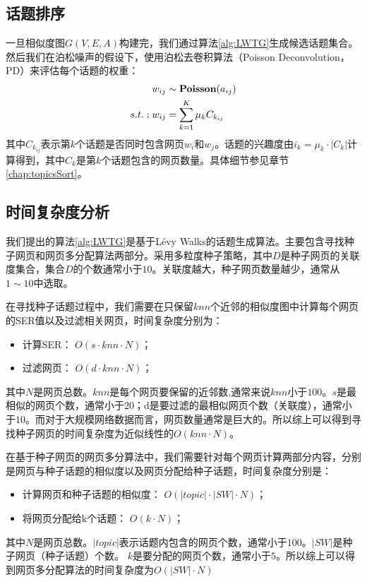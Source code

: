 \subsection{话题排序}

一旦相似度图$G(V,E,A)$构建完，我们通过算法\ref{alg:LWTG}生成候选话题集合。然后我们在泊松噪声的假设下，使用泊松去卷积算法（Poisson Deconvolution，PD）来评估每个话题的权重：
\begin{align} \label{eq:poisondeconvolution}
w_{ij} &\sim \textbf{Poisson}(a_{ij})\notag\\
s.t.: w_{ij} &= \sum_{k=1}^{K}\mu_kC_{k_{ij}}
\end{align}
其中$C_{k_{ij}}$表示第$k$个话题是否同时包含网页$w_i$和$w_j$。话题的兴趣度由$i_k=\mu_k\cdot|C_k|$计算得到，其中$C_k$是第$k$个话题包含的网页数量。具体细节参见章节\ref{chap:topicsSort}。




\subsection{时间复杂度分析}

我们提出的算法\ref{alg:LWTG}是基于L\'evy Walks的话题生成算法。主要包含寻找种子网页和网页多分配算法两部分。采用多粒度种子策略，其中$D$是种子网页的关联度集合，集合$D$的个数通常小于$10$。关联度越大，种子网页数量越少，通常从$1\sim10$中选取。

在寻找种子话题过程中，我们需要在只保留$knn$个近邻的相似度图中计算每个网页的SER值以及过滤相关网页，时间复杂度分别为：
\begin{itemize}
  \item 计算SER： $O(s\cdot knn\cdot N)$；
  \item 过滤网页： $O(d\cdot knn\cdot N)$；
\end{itemize}
其中$N$是网页总数。$knn$是每个网页要保留的近邻数,通常来说$knn$小于$100$。$s$是最相似的网页个数，通常小于$20$；d是要过滤的最相似网页个数（关联度），通常小于$10$。而对于大规模网络数据而言，网页数量通常是巨大的。所以综上可以得到寻找种子网页的时间复杂度为近似线性的$O(knn\cdot N)$。

在基于种子网页的网页多分算法中，我们需要针对每个网页计算两部分内容，分别是网页与种子话题的相似度以及网页分配给种子话题，时间复杂度分别是：
\begin{itemize}
  \item 计算网页和种子话题的相似度： $O(|topic|\cdot |SW|\cdot N)$；
  \item 将网页分配给k个话题： $O(k\cdot N)$；
\end{itemize}
其中$N$是网页总数。$|topic|$表示话题内包含的网页个数，通常小于$100$。$|SW|$是种子网页（种子话题）个数。
$k$是要分配的网页个数，通常小于$5$。所以综上可以得到网页多分配算法的时间复杂度为$O(|SW|\cdot N)$

